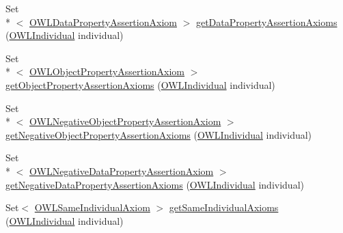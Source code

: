 \begin{DoxyCompactItemize}
\item 
Set\\*
$<$ \hyperlink{interfaceorg_1_1semanticweb_1_1owlapi_1_1model_1_1_o_w_l_data_property_assertion_axiom}{O\-W\-L\-Data\-Property\-Assertion\-Axiom} $>$ \hyperlink{classuk_1_1ac_1_1manchester_1_1cs_1_1owl_1_1owlapi_1_1_o_w_l_ontology_impl_a49253edbbdaffb78165f44eff2a75e85}{get\-Data\-Property\-Assertion\-Axioms} (\hyperlink{interfaceorg_1_1semanticweb_1_1owlapi_1_1model_1_1_o_w_l_individual}{O\-W\-L\-Individual} individual)
\item 
Set\\*
$<$ \hyperlink{interfaceorg_1_1semanticweb_1_1owlapi_1_1model_1_1_o_w_l_object_property_assertion_axiom}{O\-W\-L\-Object\-Property\-Assertion\-Axiom} $>$ \hyperlink{classuk_1_1ac_1_1manchester_1_1cs_1_1owl_1_1owlapi_1_1_o_w_l_ontology_impl_aed8921b657b6949ae5ce6cf60c1b8ce6}{get\-Object\-Property\-Assertion\-Axioms} (\hyperlink{interfaceorg_1_1semanticweb_1_1owlapi_1_1model_1_1_o_w_l_individual}{O\-W\-L\-Individual} individual)
\item 
Set\\*
$<$ \hyperlink{interfaceorg_1_1semanticweb_1_1owlapi_1_1model_1_1_o_w_l_negative_object_property_assertion_axiom}{O\-W\-L\-Negative\-Object\-Property\-Assertion\-Axiom} $>$ \hyperlink{classuk_1_1ac_1_1manchester_1_1cs_1_1owl_1_1owlapi_1_1_o_w_l_ontology_impl_ac05f7e131f74c5b06b256be94ad47ab4}{get\-Negative\-Object\-Property\-Assertion\-Axioms} (\hyperlink{interfaceorg_1_1semanticweb_1_1owlapi_1_1model_1_1_o_w_l_individual}{O\-W\-L\-Individual} individual)
\item 
Set\\*
$<$ \hyperlink{interfaceorg_1_1semanticweb_1_1owlapi_1_1model_1_1_o_w_l_negative_data_property_assertion_axiom}{O\-W\-L\-Negative\-Data\-Property\-Assertion\-Axiom} $>$ \hyperlink{classuk_1_1ac_1_1manchester_1_1cs_1_1owl_1_1owlapi_1_1_o_w_l_ontology_impl_a925e83c90f7e8d04032700b246fbede8}{get\-Negative\-Data\-Property\-Assertion\-Axioms} (\hyperlink{interfaceorg_1_1semanticweb_1_1owlapi_1_1model_1_1_o_w_l_individual}{O\-W\-L\-Individual} individual)
\item 
Set$<$ \hyperlink{interfaceorg_1_1semanticweb_1_1owlapi_1_1model_1_1_o_w_l_same_individual_axiom}{O\-W\-L\-Same\-Individual\-Axiom} $>$ \hyperlink{classuk_1_1ac_1_1manchester_1_1cs_1_1owl_1_1owlapi_1_1_o_w_l_ontology_impl_a060b016a0b98c0838281c25029881209}{get\-Same\-Individual\-Axioms} (\hyperlink{interfaceorg_1_1semanticweb_1_1owlapi_1_1model_1_1_o_w_l_individual}{O\-W\-L\-Individual} individual)
\item 

\end{DoxyCompactItemize}
